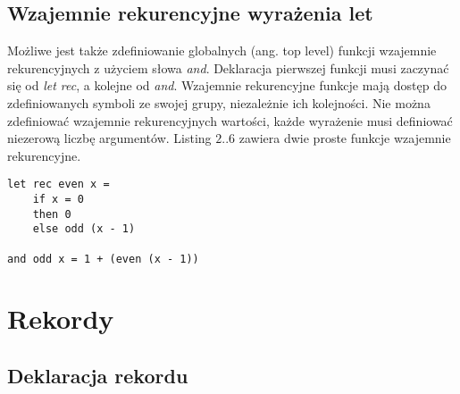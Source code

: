 \documentclass[declaration,shortabstract]{iithesis}
\begin{document}


\subsection{Wzajemnie rekurencyjne wyrażenia let}

Możliwe jest także zdefiniowanie globalnych (ang. top level) funkcji wzajemnie 
rekurencyjnych z użyciem słowa \textit{and}. Deklaracja pierwszej funkcji 
musi zaczynać się od \textit{let rec}, a kolejne od \textit{and}. Wzajemnie 
rekurencyjne funkcje mają dostęp do zdefiniowanych symboli ze swojej grupy,
niezależnie ich kolejności. Nie można zdefiniować wzajemnie rekurencyjnych 
wartości, każde wyrażenie musi definiować niezerową liczbę argumentów.
Listing $2..6$ zawiera dwie proste funkcje wzajemnie rekurencyjne.

\begin{lstlisting}[frame=single, caption=Funkcje wzajemnie rekurencyjne.]
let rec even x = 
    if x = 0
    then 0
    else odd (x - 1)

and odd x = 1 + (even (x - 1))
\end{lstlisting}




\section{Rekordy}

\subsection{Deklaracja rekordu}
\end{document}

